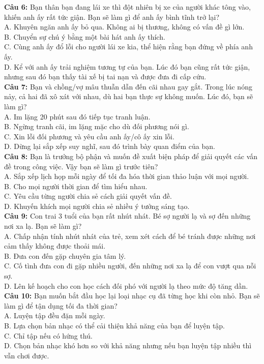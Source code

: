 \begin{multicols}{2}
\textbf{Câu 6:} Bạn thân bạn đang lái xe thì đột nhiên bị xe của người khác tông vào, khiến anh ấy rất tức giận. Bạn sẽ làm gì để anh ấy bình tĩnh trở lại? \\
A. Khuyên ngăn anh ấy bỏ qua. Không ai bị thương, không có vấn đề gì lớn. \\
B. Chuyển sự chú ý bằng một bài hát anh ấy thích. \\
C. Cùng anh ấy đổ lỗi cho người lái xe kia, thể hiện rằng bạn đứng về phía anh ấy. \\
D. Kể với anh ấy trải nghiệm tương tự của bạn. Lúc đó bạn cũng rất tức giận, nhưng sau đó bạn thấy tài xế bị tai nạn và được đưa đi cấp cứu. \\

\textbf{Câu 7:} Bạn và chồng/vợ mâu thuẫn dẫn đến cãi nhau gay gắt. Trong lúc nóng nảy, cả hai đã xô xát với nhau, dù hai bạn thực sự không muốn. Lúc đó, bạn sẽ làm gì? \\
A. Im lặng 20 phút sau đó tiếp tục tranh luận. \\
B. Ngừng tranh cãi, im lặng mặc cho dù đối phương nói gì. \\
C. Xin lỗi đối phương và yêu cầu anh ấy/cô ấy xin lỗi. \\
D. Dừng lại sắp xếp suy nghĩ, sau đó trình bày quan điểm của bạn. \\

\textbf{Câu 8:} Bạn là trưởng bộ phận và muốn đề xuất biện pháp để giải quyết các vấn đề trong công việc. Vậy bạn sẽ làm gì trước tiên? \\
A. Sắp xếp lịch họp mỗi ngày để tối đa hóa thời gian thảo luận với mọi người. \\
B. Cho mọi người thời gian để tìm hiểu nhau. \\
C. Yêu cầu từng người chia sẻ cách giải quyết vấn đề. \\
D. Khuyến khích mọi người chia sẻ nhiều ý tưởng sáng tạo. \\

\textbf{Câu 9:} Con trai 3 tuổi của bạn rất nhút nhát. Bé sợ người lạ và sợ đến những nơi xa lạ. Bạn sẽ làm gì? \\
A. Chấp nhận tính nhút nhát của trẻ, xem xét cách để bé tránh được những nơi cảm thấy không được thoải mái. \\
B. Đưa con đến gặp chuyên gia tâm lý. \\
C. Cố tình đưa con đi gặp nhiều người, đến những nơi xa lạ để con vượt qua nỗi sợ. \\
D. Lên kế hoạch cho con học cách đối phó với người lạ theo mức độ tăng dần. \\

\textbf{Câu 10:} Bạn muốn bắt đầu học lại loại nhạc cụ đã từng học khi còn nhỏ. Bạn sẽ làm gì để tận dụng tối đa thời gian? \\
A. Luyện tập đều đặn mỗi ngày. \\
B. Lựa chọn bản nhạc có thể cải thiện khả năng của bạn để luyện tập. \\
C. Chỉ tập nếu có hứng thú. \\
D. Chọn bản nhạc khó hơn so với khả năng nhưng nếu bạn luyện tập nhiều thì vẫn chơi được. \\
\end{multicols}

